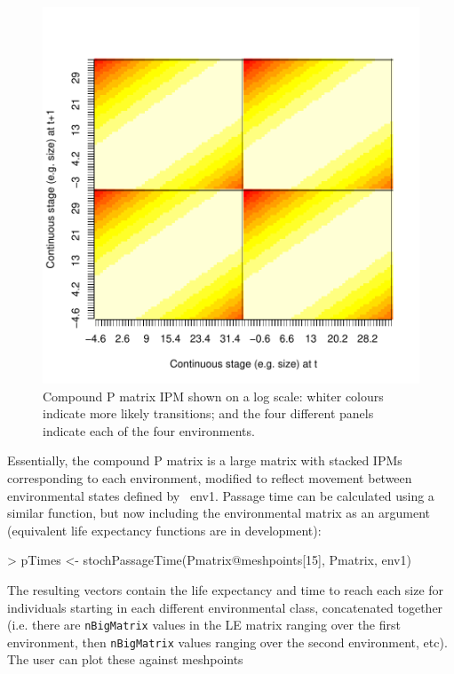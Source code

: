 \documentclass{article}
\begin{document}
\begin{figure}
\begin{center}
\includegraphics{IPMpack_vignette-figCompound}
\end{center}
\caption{Compound P matrix IPM shown on a log scale: whiter colours indicate
  more likely transitions; and the four different panels indicate each
  of the four environments.}
\label{fig:five}
\end{figure}
Essentially, the compound P matrix is a large matrix with stacked IPMs
corresponding to each environment, modified to reflect movement
between environmental states defined by {\ env1}. Passage time can be
calculated using a similar function, but now including the environmental
matrix as an argument (equivalent life expectancy functions are in development): 
\begin{Schunk}
\begin{Sinput}
> pTimes <- stochPassageTime(Pmatrix@meshpoints[15], Pmatrix, env1)
\end{Sinput}
\end{Schunk}
The resulting vectors contain the life expectancy and time to reach each size for individuals starting in each different environmental class, concatenated together (i.e. there are {\tt nBigMatrix} values in the LE matrix ranging over the first environment, then {\tt nBigMatrix} values ranging over the second environment, etc). The user can plot these against meshpoints 
\end{document}
